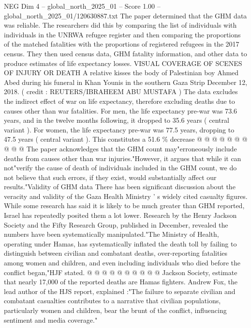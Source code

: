 \begin{textsample}{NEG Dim 4 – global\_north\_2025\_01 – Score 1.00 – global\_north\_2025\_01/120630887.txt}  \label{ex:f4_neg_417}
The paper determined that the GHM data was reliable.
The researchers did this by comparing the list of individuals with individuals in the UNRWA refugee register and then comparing the proportions of the matched fatalities with the proportions of registered refugees in the 2017 census.
They then used census data, GHM fatality information, and other data to produce estimates of life expectancy losses.
VISUAL COVERAGE OF SCENES OF INJURY OR DEATH A relative kisses the body of Palestinian boy Ahmed Abed during his funeral in Khan Younis in the southern Gaza Strip December 12, 2018. ( credit : REUTERS/IBRAHEEM ABU MUSTAFA ) The data excludes the indirect effect of war on life expectancy, therefore excluding deaths due to causes other than war fatalities.
For men, the life expectancy pre-war was 73.6 years, and in the twelve months following, it dropped to 35.6 years ( central variant ).
For women, the life expectancy pre-war was 77.5 years, dropping to 47.5 years ( central variant ).
This constitutes a 51.6 \% decrease @ @ @ @ @ @ @ @ @ @ The paper acknowledges that the GHM count may"erroneously include deaths from causes other than war injuries."However, it argues that while it can not"verify the cause of death of individuals included in the GHM count, we do not believe that such errors, if they exist, would substantially affect our results."Validity of GHM data There has been significant discussion about the veracity and validity of the Gaza Health Ministry ' s widely cited casualty figures.
While some research has said it is likely to be much greater than GHM reported, Israel has repeatedly posited them a lot lower.
Research by the Henry Jackson Society and the Fifty Research Group, published in December, revealed the numbers have been systematically manipulated."The Ministry of Health, operating under Hamas, has systematically inflated the death toll by failing to distinguish between civilian and combatant deaths, over-reporting fatalities among women and children, and even including individuals who died before the conflict began,"HJF stated. @ @ @ @ @ @ @ @ @ @ Jackson Society, estimate that nearly 17,000 of the reported deaths are Hamas fighters.
Andrew Fox, the lead author of the HJS report, explained :"The failure to separate civilian and combatant casualties contributes to a narrative that civilian populations, particularly women and children, bear the brunt of the conflict, influencing sentiment and media coverage."

\end{textsample}
